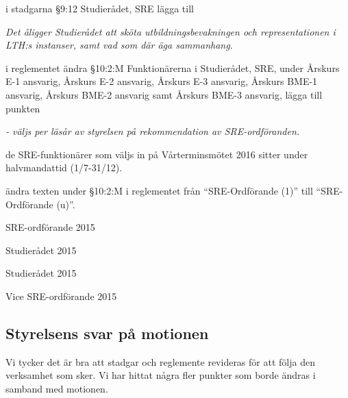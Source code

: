\documentclass[../_main/handlingar.tex]{subfiles}
\begin{document}
\begin{attsatser}
  \att i stadgarna \S9:12 Studierådet, SRE lägga till\par
  \emph{Det åligger Studierådet att sköta utbildningsbevakningen och representationen i LTH:s instanser, samt vad som där äga sammanhang.}

  \newpage
  \att i reglementet ändra \S10:2:M Funktionärerna i Studierådet, SRE, under Årskurs E-1 ansvarig, Årskurs E-2 ansvarig, Årskurs E-3 ansvarig, Årskurs BME-1 ansvarig, Årskurs BME-2 ansvarig samt Årskurs BME-3 ansvarig, lägga till punkten\par
  \emph{- väljs per läsår av styrelsen på rekommendation av SRE-ordföranden.}

  \att de SRE-funktionärer som väljs in på Vårterminsmötet 2016 sitter under halvmandattid (1/7-31/12).

  \att ändra texten under \S10:2:M i reglementet från ``SRE-Ordförande (1)'' till ``SRE-Ordförande (u)''.
\end{attsatser}

\begin{signatures}{4}
    \mvh
    \signature{Sofia Karlén}{SRE-ordförande 2015}
    \signature{Fredrik Peterson}{Studierådet 2015}
    \signature{Johan Persson}{Studierådet 2015}
    \signature{Molly Rusk}{Vice SRE-ordförande 2015}
\end{signatures}

\subsection*{Styrelsens svar på motionen}
Vi tycker det är bra att stadgar och reglemente revideras för att följa den verksamhet som sker. Vi har hittat några fler punkter som borde ändras i samband med motionen.
\end{document}
